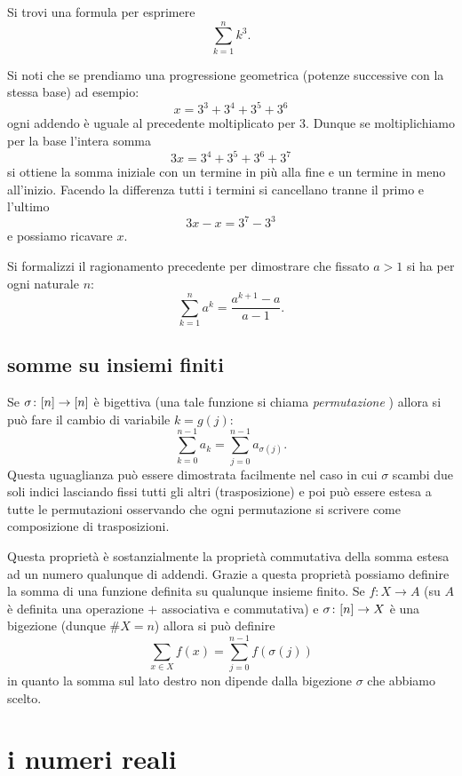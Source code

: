 \begin{exercise}
  Si trovi una formula per esprimere
  \[
  \sum_{k=1}^n k^3.
  \]
\end{exercise}

\begin{exercise}
Si noti che se prendiamo una progressione geometrica 
(potenze successive con la stessa base) 
ad esempio:
\[
  x = 3^3 + 3^4 + 3^5 + 3^6
\]
ogni addendo è uguale al precedente moltiplicato per $3$.
Dunque se moltiplichiamo per la base l'intera somma
\[
  3x = 3^4 + 3^5 + 3^6 + 3^7
\]
si ottiene la somma iniziale con un termine in più alla fine 
e un termine in meno all'inizio. 
Facendo la differenza tutti i termini si cancellano tranne 
il primo e l'ultimo
\[
 3x - x = 3^7 - 3^3  
\]
e possiamo ricavare $x$.

Si formalizzi il ragionamento precedente per dimostrare che 
fissato $a>1$ si ha per ogni naturale $n$:
  \[
    \sum_{k=1}^n a^k = \frac{a^{k+1}-a}{a-1}.  
  \] 
\end{exercise}

\subsection{somme su insiemi finiti}

Se $\sigma\colon {\left[ n \right]} \to {\left[ n \right]}$
è bigettiva (una tale funzione si chiama \emph{permutazione}%
%
)
allora si può fare il cambio di variabile $k=g(j)$:
\[
    \sum_{k=0}^{n-1} a_k = \sum_{j=0}^{n-1} a_{\sigma(j)}.
\]
Questa uguaglianza può essere dimostrata facilmente nel caso 
in cui $\sigma$ scambi due soli indici lasciando fissi tutti gli altri 
(trasposizione) e poi può essere estesa a tutte le permutazioni
osservando che ogni permutazione si scrivere come composizione 
di trasposizioni.

Questa proprietà è sostanzialmente la proprietà commutativa della somma 
estesa ad un numero qualunque di addendi.
Grazie a questa proprietà possiamo definire la somma di una funzione 
definita su qualunque insieme finito. 
Se $f\colon X \to A$ 
(su $A$ è definita una operazione $+$ associativa e commutativa)
e $\sigma\colon {\left[ n \right]} \to X$ è una bigezione (dunque $\#X = n$)
allora si può definire 
\[
  \sum_{x\in X} f(x) = \sum_{j=0}^{n-1} f(\sigma(j))  
\]
in quanto la somma sul lato destro non dipende dalla bigezione $\sigma$ che 
abbiamo scelto.

\section{i numeri reali}

